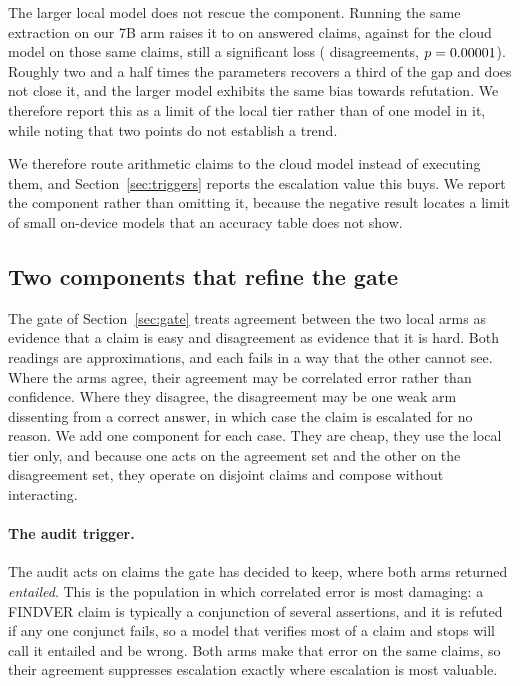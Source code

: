 \documentclass{article}
\begin{document}
The larger local model does not rescue the component. Running the same extraction on our 7B
arm raises it to \arithSevenBAcc{} on \arithSevenBAnswered{} answered claims, against
\arithSevenBCloudAcc{} for the cloud model on those same claims, still a significant loss
(\arithSevenBDisagree{} disagreements, $p = 0.00001{}$). Roughly two and a half times the
parameters recovers a third of the gap and does not close it, and the larger model exhibits
the same bias towards refutation. We therefore report this as a limit of the local tier
rather than of one model in it, while noting that two points do not establish a trend.

We therefore route arithmetic claims to the cloud model instead of executing them, and
Section~\ref{sec:triggers} reports the escalation value this buys. We report the component
rather than omitting it, because the negative result locates a limit of small on-device models
that an accuracy table does not show.

\subsection{Two components that refine the gate}
\label{sec:skills}

The gate of Section~\ref{sec:gate} treats agreement between the two local arms as evidence
that a claim is easy and disagreement as evidence that it is hard. Both readings are
approximations, and each fails in a way that the other cannot see. Where the arms agree,
their agreement may be correlated error rather than confidence. Where they disagree, the
disagreement may be one weak arm dissenting from a correct answer, in which case the claim
is escalated for no reason. We add one component for each case. They are cheap, they use
the local tier only, and because one acts on the agreement set and the other on the
disagreement set, they operate on disjoint claims and compose without interacting.

\paragraph{The audit trigger.}
The audit acts on claims the gate has decided to keep, where both arms returned
\emph{entailed}. This is the population in which correlated error is most damaging: a
FINDVER claim is typically a conjunction of several assertions, and it is refuted if any one
conjunct fails, so a model that verifies most of a claim and stops will call it entailed and
be wrong. Both arms make that error on the same claims, so their agreement suppresses
escalation exactly where escalation is most valuable.
\end{document}
